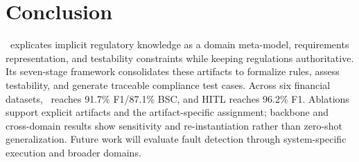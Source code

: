 \section{Conclusion}
\label{sec:conclusion}


\ourtool\ explicates implicit regulatory knowledge as a domain meta-model,
requirements representation, and testability constraints while keeping
regulations authoritative. Its seven-stage framework consolidates these
artifacts to formalize rules, assess testability, and generate traceable
compliance test cases. Across six financial datasets, \ourtool\ reaches 91.7\%
F1/87.1\% BSC, and HITL reaches 96.2\% F1. Ablations support explicit artifacts
and the artifact-specific assignment; backbone and cross-domain results show
sensitivity and re-instantiation rather than zero-shot generalization. Future
work will evaluate fault detection through system-specific execution and
broader domains.

